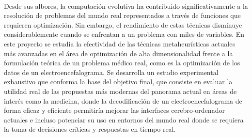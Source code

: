 \chapter*{}






\cleardoublepage
\thispagestyle{empty}

\begin{center}
{\large\bfseries \myTitle}\\
\end{center}
\begin{center}
\myName\\
\end{center}

\\

\vspace{0.7cm}
\\

Desde sus albores, la computación evolutiva ha contribuido significativamente a la resolución de problemas del mundo real representados a través de funciones que requieren optimización. Sin embargo, el rendimiento de estas técnicas disminuye considerablemente cuando se enfrentan a un problema con miles de variables. En este proyecto se estudia la efectividad de las técnicas metaheurísticas actuales más avanzadas en el área de optimización de alta dimensionalidad frente a la formulación teórica de un problema médico real, como es la optimización de los datos de un electroencefalograma. Se desarrolla un estudio experimental exhaustivo que conforma la base del objetivo final, que consiste en evaluar la utilidad real de las propuestas más modernas del panorama actual en áreas de interés como la medicina, donde la decodificación de un electroencefalograma de forma eficaz y eficiente permitiría mejorar las interfaces cerebro-ordenador actuales e incluso potenciar su uso en entornos del mundo real donde se requiera la toma de decisiones críticas y respuestas en tiempo real.

\cleardoublepage


\thispagestyle{empty}



